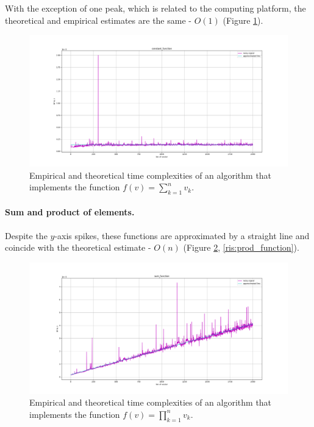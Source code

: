 With the exception of one peak, which is related to the computing platform, the theoretical and empirical estimates are the same - $O(1)$ (Figure \ref{ris:constant_function}).

\begin{figure}[H]
    \center
    \includegraphics[width=\textwidth]{img/constant_function.png}
    \caption{Empirical and theoretical time complexities of an algorithm that implements the function $f(v) = \sum^{n}_{k = 1}{v_k}$.}
    \label{ris:constant_function}
\end{figure}

\paragraph{Sum and product of elements.}

Despite the $y$-axis spikes, these functions are approximated by a straight line and coincide with the theoretical estimate - $O(n)$ (Figure \ref{ris:sum_function}, \ref{ris:prod_function}).

\begin{figure}[H]
    \center
    \includegraphics[width=\textwidth]{img/sum_function.png}
    \caption{Empirical and theoretical time complexities of an algorithm that implements the function $f(v) = \prod^{n}_{k = 1}{v_k}$.}
    \label{ris:sum_function}
\end{figure}

